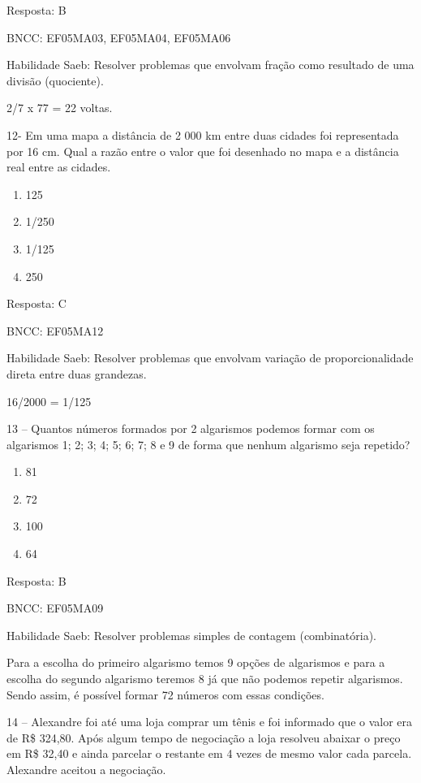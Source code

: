 Resposta: B

BNCC: EF05MA03, EF05MA04, EF05MA06

Habilidade Saeb: Resolver problemas que envolvam fração como resultado
de uma divisão (quociente).

2/7 x 77 = 22 voltas.

12- Em uma mapa a distância de 2 000 km entre duas cidades foi
representada por 16 cm. Qual a razão entre o valor que foi desenhado no
mapa e a distância real entre as cidades.

\begin{enumerate}
\def\labelenumi{\alph{enumi})}
\item
  125
\item
  1/250
\item
  1/125
\item
  250
\end{enumerate}

Resposta: C

BNCC: EF05MA12

Habilidade Saeb: Resolver problemas que envolvam variação de
proporcionalidade direta entre duas grandezas.

16/2000 = 1/125

13 -- Quantos números formados por 2 algarismos podemos formar com os
algarismos 1; 2; 3; 4; 5; 6; 7; 8 e 9 de forma que nenhum algarismo seja
repetido?

\begin{enumerate}
\def\labelenumi{\alph{enumi})}
\item
  81
\item
  72
\item
  100
\item
  64
\end{enumerate}

Resposta: B

BNCC: EF05MA09

Habilidade Saeb: Resolver problemas simples de contagem (combinatória).

Para a escolha do primeiro algarismo temos 9 opções de algarismos e para
a escolha do segundo algarismo teremos 8 já que não podemos repetir
algarismos. Sendo assim, é possível formar 72 números com essas
condições.

14 -- Alexandre foi até uma loja comprar um tênis e foi informado que o
valor era de R\$ 324,80. Após algum tempo de negociação a loja resolveu
abaixar o preço em R\$ 32,40 e ainda parcelar o restante em 4 vezes de
mesmo valor cada parcela. Alexandre aceitou a negociação.

